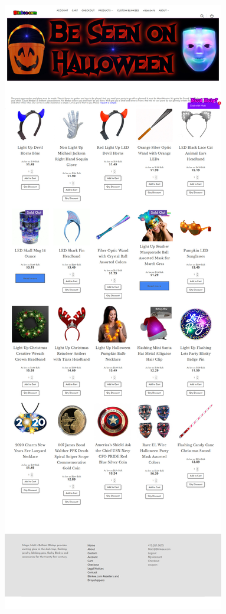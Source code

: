 \documentclass[a4paper,11pt,oneside]{scrreprt}
\begin{document}
\begin{figure}[H]
	\centering
	\includegraphics[clip, trim=0cm 129.6cm 0cm 0cm, scale=0.35]{./images/blinkee.jpg}

\end{figure}
\end{document}
